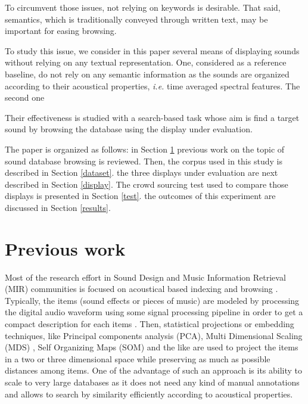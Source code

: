 \documentclass{aes2e}
\begin{document}
To circumvent those issues, not relying on keywords is desirable. That said, semantics, which is traditionally conveyed through written text, may be important for easing browsing.  

To study this issue, we consider in this paper several means of displaying sounds without relying on any textual representation. One, considered as a reference baseline, do not rely on any semantic information as the sounds are organized according to their acoustical properties, \textit{i.e.} time averaged spectral features. The second one 

Their effectiveness is studied with a search-based task whose aim is find a target sound by browsing the database using the display under evaluation.

The paper is organized as follows: in Section \ref{previous} previous work on the topic of sound database browsing is reviewed. Then, the corpus used in this study is described in Section \ref{dataset}. the three displays under evaluation are next described in Section \ref{display}. The crowd sourcing test used to compare those displays is presented in Section \ref{test}. the outcomes of this experiment are discussed in Section \ref{results}.  

\section{Previous work} \label{previous}

Most of the research effort in Sound Design and Music Information Retrieval (MIR) communities is focused on acoustical based indexing and browsing \cite{tzanetakis2003musescape, streich2008music}. Typically, the items (sound effects or pieces of music) are modeled by processing the digital audio waveform using some signal processing pipeline in order to get a compact description for each  items
\cite{coleman2007mused}. Then, statistical projections or embedding techniques, like Principal components analysis (PCA),  Multi Dimensional Scaling (MDS) \cite{schwarz2009sound,Cano2002}, Self Organizing Maps (SOM) \cite{pampalk2004exploring} and the like are used to project the items in a two or three dimensional space while preserving as much as possible distances among items. One of the advantage of such an approach is its ability to scale to very large databases \cite{schwarz2009scalability} as it does not need any kind of manual annotations and allows to search by similarity efficiently according to acoustical properties.
\end{document}
